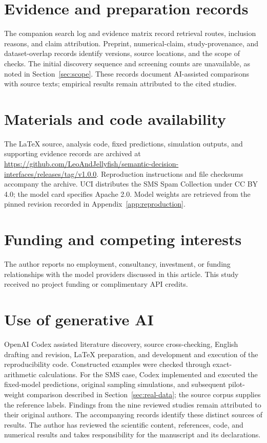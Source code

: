 \documentclass[11pt,a4paper]{article}
\begin{document}
\section{Evidence and preparation records}

The companion search log and evidence matrix record retrieval routes, inclusion reasons, and claim attribution. Preprint, numerical-claim, study-provenance, and dataset-overlap records identify versions, source locations, and the scope of checks. The initial discovery sequence and screening counts are unavailable, as noted in Section~\ref{sec:scope}. These records document AI-assisted comparisons with source texts; empirical results remain attributed to the cited studies.

\section*{Materials and code availability}
The LaTeX source, analysis code, fixed predictions, simulation outputs, and supporting evidence records are archived at \url{https://github.com/LeoAndJellyfish/semantic-decision-interfaces/releases/tag/v1.0.0}. Reproduction instructions and file checksums accompany the archive. UCI distributes the SMS Spam Collection under CC BY 4.0; the model card specifies Apache 2.0. Model weights are retrieved from the pinned revision recorded in Appendix~\ref{app:reproduction}.

\section*{Funding and competing interests}
The author reports no employment, consultancy, investment, or funding relationships with the model providers discussed in this article. This study received no project funding or complimentary API credits.

\section*{Use of generative AI}
OpenAI Codex assisted literature discovery, source cross-checking, English drafting and revision, LaTeX preparation, and development and execution of the reproducibility code. Constructed examples were checked through exact-arithmetic calculations. For the SMS case, Codex implemented and executed the fixed-model predictions, original sampling simulations, and subsequent pilot-weight comparison described in Section~\ref{sec:real-data}; the source corpus supplies the reference labels. Findings from the nine reviewed studies remain attributed to their original authors. The accompanying records identify these distinct sources of results. The author has reviewed the scientific content, references, code, and numerical results and takes responsibility for the manuscript and its declarations.
\end{document}
